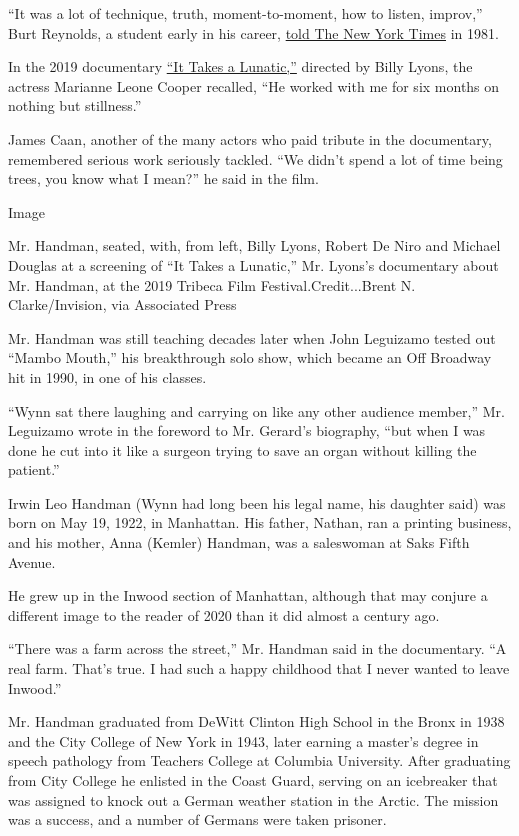 ``It was a lot of technique, truth, moment-to-moment, how to listen,
improv,'' Burt Reynolds, a student early in his career,
\href{https://www.nytimes3xbfgragh.onion/1981/03/29/magazine/burt-reynolds-going-beyond-macho.html?searchResultPosition=5}{told
The New York Times} in 1981.

In the 2019 documentary
\href{https://www.netflix.com/title/81078456}{``It Takes a Lunatic,''}
directed by Billy Lyons, the actress Marianne Leone Cooper recalled,
``He worked with me for six months on nothing but stillness.''

James Caan, another of the many actors who paid tribute in the
documentary, remembered serious work seriously tackled. ``We didn't
spend a lot of time being trees, you know what I mean?'' he said in the
film.

Image

Mr. Handman, seated, with, from left, Billy Lyons, Robert De Niro and
Michael Douglas at a screening of ``It Takes a Lunatic,'' Mr. Lyons's
documentary about Mr. Handman, at the 2019 Tribeca Film
Festival.Credit...Brent N. Clarke/Invision, via Associated Press

Mr. Handman was still teaching decades later when John Leguizamo tested
out ``Mambo Mouth,'' his breakthrough solo show, which became an Off
Broadway hit in 1990, in one of his classes.

``Wynn sat there laughing and carrying on like any other audience
member,'' Mr. Leguizamo wrote in the foreword to Mr. Gerard's biography,
``but when I was done he cut into it like a surgeon trying to save an
organ without killing the patient.''

Irwin Leo Handman (Wynn had long been his legal name, his daughter said)
was born on May 19, 1922, in Manhattan. His father, Nathan, ran a
printing business, and his mother, Anna (Kemler) Handman, was a
saleswoman at Saks Fifth Avenue.

He grew up in the Inwood section of Manhattan, although that may conjure
a different image to the reader of 2020 than it did almost a century
ago.

``There was a farm across the street,'' Mr. Handman said in the
documentary. ``A real farm. That's true. I had such a happy childhood
that I never wanted to leave Inwood.''

Mr. Handman graduated from DeWitt Clinton High School in the Bronx in
1938 and the City College of New York in 1943, later earning a master's
degree in speech pathology from Teachers College at Columbia University.
After graduating from City College he enlisted in the Coast Guard,
serving on an icebreaker that was assigned to knock out a German weather
station in the Arctic. The mission was a success, and a number of
Germans were taken prisoner.

